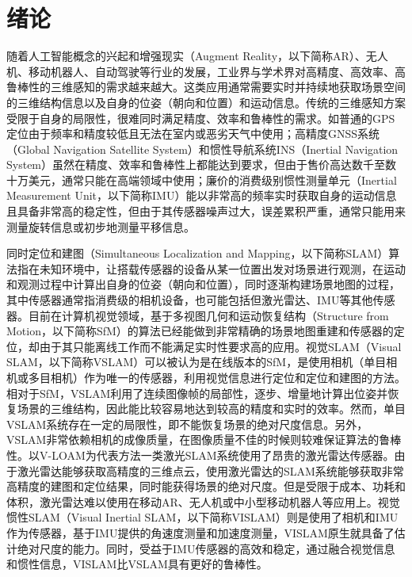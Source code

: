 \chapter{绪论}\label{ch:intro}

随着人工智能概念的兴起和增强现实（Augment Reality，以下简称AR）、无人机、移动机器人、自动驾驶等行业的发展，工业界与学术界对高精度、高效率、高鲁棒性的三维感知的需求越来越大。这类应用通常需要实时并持续地获取场景空间的三维结构信息以及自身的位姿（朝向和位置）和运动信息。传统的三维感知方案受限于自身的局限性，很难同时满足精度、效率和鲁棒性的需求。如普通的GPS定位由于频率和精度较低且无法在室内或恶劣天气中使用；高精度GNSS系统（Global Navigation Satellite System）和惯性导航系统INS（Inertial Navigation System）虽然在精度、效率和鲁棒性上都能达到要求，但由于售价高达数千至数十万美元，通常只能在高端领域中使用；廉价的消费级别惯性测量单元（Inertial Measurement Unit，以下简称IMU）能以非常高的频率实时获取自身的运动信息且具备非常高的稳定性，但由于其传感器噪声过大，误差累积严重，通常只能用来测量旋转信息或初步地测量平移信息。

同时定位和建图（Simultaneous Localization and Mapping，以下简称SLAM）算法指在未知环境中，让搭载传感器的设备从某一位置出发对场景进行观测，在运动和观测过程中计算出自身的位姿（朝向和位置），同时逐渐构建场景地图的过程，其中传感器通常指消费级的相机设备，也可能包括但激光雷达、IMU等其他传感器。目前在计算机视觉领域，基于多视图几何和运动恢复结构（Structure from Motion，以下简称SfM）的算法\citep{hartley2003multiple,ma2012invitation}已经能做到非常精确的场景地图重建和传感器的定位，却由于其只能离线工作而不能满足实时性要求高的应用。视觉SLAM（Visual SLAM，以下简称VSLAM）可以被认为是在线版本的SfM，是使用相机（单目相机或多目相机）作为唯一的传感器，利用视觉信息进行定位和定位和建图的方法。相对于SfM，VSLAM利用了连续图像帧的局部性，逐步、增量地计算出位姿并恢复场景的三维结构，因此能比较容易地达到较高的精度和实时的效率。然而，单目VSLAM系统存在一定的局限性，即不能恢复场景的绝对尺度信息。另外，VSLAM非常依赖相机的成像质量，在图像质量不佳的时候则较难保证算法的鲁棒性。以V-LOAM\citep{zhang2015visual}为代表方法一类激光SLAM系统使用了昂贵的激光雷达传感器。由于激光雷达能够获取高精度的三维点云，使用激光雷达的SLAM系统能够获取非常高精度的建图和定位结果，同时能获得场景的绝对尺度。但是受限于成本、功耗和体积，激光雷达难以使用在移动AR、无人机或中小型移动机器人等应用上。视觉惯性SLAM（Visual Inertial SLAM，以下简称VISLAM）则是使用了相机和IMU作为传感器，基于IMU提供的角速度测量和加速度测量，VISLAM原生就具备了估计绝对尺度的能力。同时，受益于IMU传感器的高效和稳定，通过融合视觉信息和惯性信息，VISLAM比VSLAM具有更好的鲁棒性。

